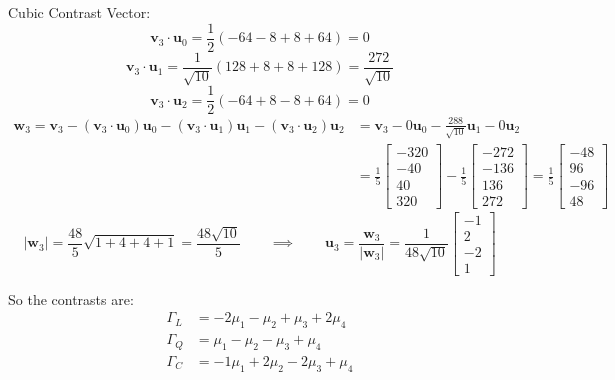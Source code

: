 \documentclass[11pt]{article}
\begin{document}
\begin{enumerate}
Cubic Contrast Vector:
\begin{equation*}
\mathbf{v}_3\cdot\mathbf{u}_0=\frac{1}{2}(-64-8+8+64)=0
\end{equation*}
\begin{equation*}
\mathbf{v}_3\cdot\mathbf{u}_1=\frac{1}{\sqrt{10}}(128+8+8+128)=\frac{272}{\sqrt{10}}
\end{equation*}
\begin{equation*}
\mathbf{v}_3\cdot\mathbf{u}_2=\frac{1}{2}(-64+8-8+64)=0
\end{equation*}
\begin{align*}
\mathbf{w}_3=\mathbf{v}_3-(\mathbf{v}_3\cdot\mathbf{u}_0)\mathbf{u}_0-(\mathbf{v}_3\cdot\mathbf{u}_1)\mathbf{u}_1-(\mathbf{v}_3\cdot\mathbf{u}_2)\mathbf{u}_2
&=\mathbf{v}_3-0\mathbf{u}_0-\frac{288}{\sqrt{10}}\mathbf{u}_1-0\mathbf{u}_2\\
&=\frac{1}{5}\begin{bmatrix}-320 \\ -40 \\ 40 \\ 320\end{bmatrix}-\frac{1}{5}\begin{bmatrix}-272 \\ -136 \\ 136 \\ 272\end{bmatrix}
=\frac{1}{5}\begin{bmatrix}-48 \\ 96 \\ -96 \\ 48\end{bmatrix}
\end{align*}
\begin{equation*}
|\mathbf{w}_3|=\frac{48}{5}\sqrt{1+4+4+1}=\frac{48\sqrt{10}}{5}\qquad\implies\qquad
\mathbf{u}_3=\frac{\mathbf{w}_3}{|\mathbf{w}_3|}=\frac{1}{48\sqrt{10}}\begin{bmatrix}-1 \\ 2 \\ -2 \\ 1\end{bmatrix}
\end{equation*}

So the contrasts are:
\begin{align*}
\Gamma_L&=-2\mu_1-\mu_2+\mu_3+2\mu_4\\
\Gamma_Q&=\mu_1-\mu_2-\mu_3+\mu_4\\
\Gamma_C&=-1\mu_1+2\mu_2-2\mu_3+\mu_4\\
\end{align*}


\end{enumerate}
\end{document}
